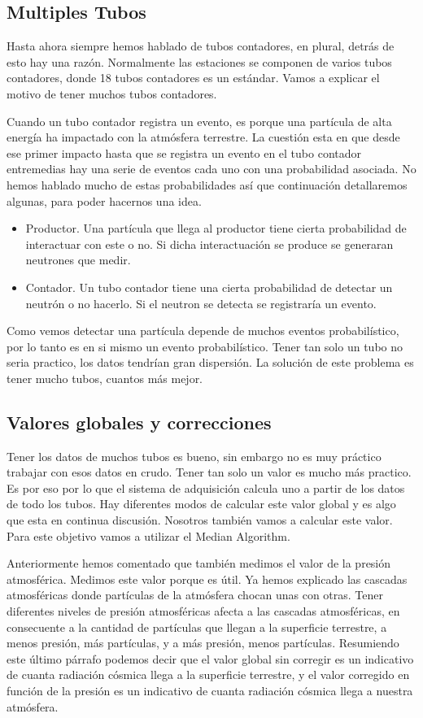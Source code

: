 	\subsection{Multiples Tubos}
		Hasta ahora siempre hemos hablado de tubos contadores, en plural, detrás de esto hay una razón. Normalmente las estaciones se componen de
		varios tubos contadores, donde 18 tubos contadores es un estándar. Vamos a explicar el motivo de tener muchos tubos contadores. 
		\par
		Cuando un tubo contador registra un evento, es porque una partícula de alta energía ha impactado con la atmósfera terrestre. La cuestión esta
		en que desde ese primer impacto hasta que se registra un evento en el tubo contador entremedias hay una serie de eventos cada uno con una
		probabilidad asociada. No hemos hablado mucho de estas probabilidades así que continuación detallaremos algunas, para poder hacernos una idea. 
		\begin{itemize}
			\item Productor. 	Una partícula que llega al productor tiene cierta probabilidad de interactuar con este o no. Si dicha
			  			interactuación se produce se generaran neutrones que medir.
			\item Contador. 	Un tubo contador tiene una cierta probabilidad de detectar un neutrón o no hacerlo. Si el neutron se detecta
			  			se registraría un evento.
		\end{itemize}
		Como vemos detectar una partícula depende de muchos eventos probabilístico, por lo tanto es en si mismo un evento probabilístico. Tener tan
		solo un tubo no seria practico, los datos tendrían gran dispersión. La solución de este problema es tener mucho tubos, cuantos más mejor.
	\subsection{Valores globales y correcciones}
		Tener los datos de muchos tubos es bueno, sin embargo no es muy práctico trabajar con esos datos en crudo. Tener tan solo un valor es mucho
		más practico. Es por eso por lo que el sistema de adquisición calcula uno a partir de los datos de todo los tubos. Hay diferentes modos de
		calcular este valor global y es algo que esta en continua discusión. Nosotros también vamos a calcular este valor. Para este objetivo vamos
		a utilizar el Median Algorithm. 
		\par
		Anteriormente hemos comentado que también medimos el valor de la presión atmosférica. Medimos este valor porque es útil. Ya hemos explicado
		las cascadas atmosféricas donde partículas de la atmósfera chocan unas con otras. Tener diferentes niveles de presión atmosféricas afecta a
		las cascadas atmosféricas, en consecuente a la cantidad de partículas que llegan a la superficie terrestre, a menos presión, más partículas,
		y a más presión, menos partículas. Resumiendo este último párrafo  podemos decir que el valor global sin corregir es un indicativo de cuanta
		radiación cósmica llega a la superficie terrestre, y el valor corregido en función de la presión es un indicativo de cuanta radiación cósmica
		llega a nuestra atmósfera.
